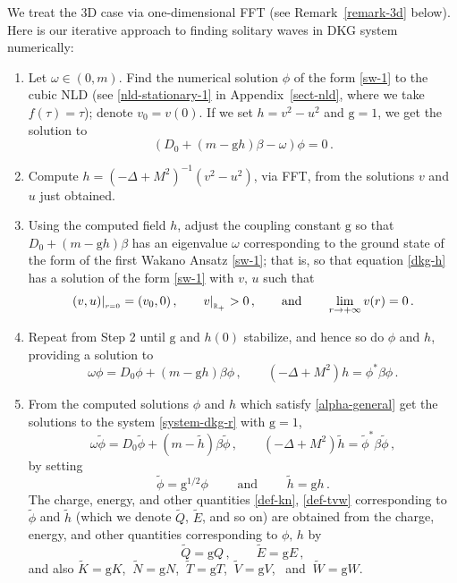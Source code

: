 \documentclass[12pt]{extarticle}
\newcommand{\coupling}{\mathrm{g}}
\newcommand{\at}[1]{\vert\sb{\sb{#1}}}
\def\R{\mathbb{R}}
\theoremstyle{plain}
\theoremstyle{remark}
\begin{document}
We treat the 3D case
via one-dimensional FFT
(see Remark~\ref{remark-3d} below).
Here is our iterative
approach to finding solitary waves
in DKG system
numerically:
\begin{enumerate}
\item
Let $\omega\in(0,m)$.
Find the numerical solution
$\phi$
of the form \eqref{sw-1}
to the cubic NLD
(see \eqref{nld-stationary-1}
in Appendix~\ref{sect-nld},
where we take $f(\tau)=\tau$);
denote $v_0=v(0)$.
If we set
$h=v^2-u^2$ and $\coupling=1$,
we get the solution to
\begin{equation}\label{dkg-h}
    (D_0+(m-\coupling h)
    \beta-\omega)\phi=0\,.
\end{equation}

\item
Compute
$h=(-\Delta+M^2)^{-1}(v^2-u^2)$, via FFT, from
the solutions $v$ and $u$ just obtained.

\item
Using the computed field $h$,
adjust the coupling constant
$\coupling$
so that
$D_0+(m-\coupling h)\beta$
has an eigenvalue
$\omega$ corresponding to the ground state
of the form of the first Wakano Ansatz
\eqref{sw-1};
that is,
so that equation \eqref{dkg-h}
has a solution
of the form \eqref{sw-1}
with $v,\,u$ such that
\[
(v,u)\at{r=0}=(v_0,0)\,,
\qquad v\at{\R_{+}}>0\,,
\qquad \text{and} \qquad
\lim_{r\to+\infty}v(r)=0\,.
\]

\item
Repeat from Step 2 until
$\coupling$
and $h(0)$
stabilize,
and hence so do $\phi$ and $h$,
providing a solution to
\begin{equation}\label{alpha-general}
    \omega\phi
    =D_0\phi
    +(m-\coupling h)\beta\phi\,,
    \qquad
    (-\Delta+M^2)h 
    = \phi^*\beta\phi\,.
\end{equation}

\item
From
the computed solutions
$\phi$ and $h$
which satisfy \eqref{alpha-general}
get the solutions
to the system
\eqref{system-dkg-r}
with $\coupling=1$,
\begin{equation}\label{alpha-one}
    \omega\tilde\phi
    =D_0\tilde\phi
    +(m-\tilde h)\beta
    \tilde\phi\,,
    \qquad
    (-\Delta+M^2)\tilde h
    =\tilde\phi^*\beta\tilde\phi\,,
\end{equation}
by setting
\begin{equation}\label{alpha-change}
    \tilde\phi
    =\coupling^{1/2}\phi
    \qquad \text{ and } \qquad
    \tilde h=\coupling h\,.
\end{equation}
The charge, energy,
and other quantities
\eqref{def-kn}, \eqref{def-tvw}
corresponding to $\tilde\phi$ and
$\tilde h$
(which we denote
$\tilde Q$, $\tilde E$,
and so on)
are obtained from the charge, energy,
and other quantities
corresponding to $\phi,\,h$ by
\begin{equation}\label{alpha-q-e-change}
    \tilde Q=\coupling Q\,,
    \qquad
\tilde E=\coupling E\,,
\end{equation}
and also
$\tilde K=\coupling K$,
$\ \tilde N=\coupling N$,
$\ \tilde T=\coupling T$,
$\ \tilde V=\coupling V$,
\ and
$\ \tilde W=\coupling W$.
\end{enumerate}
\end{document}
